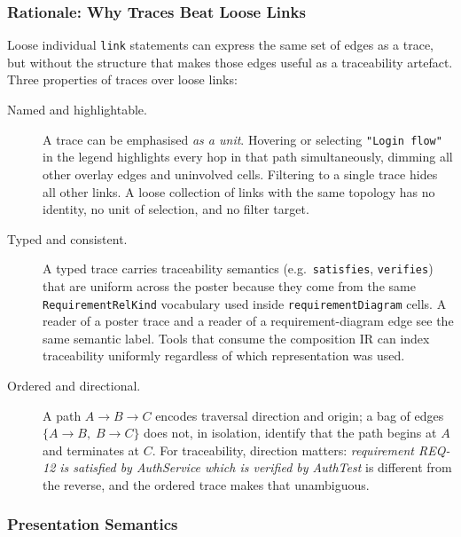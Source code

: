 \subsubsection{Rationale: Why Traces Beat Loose Links}
\label{sec:cdl-trace-rationale}

Loose individual \texttt{link} statements can express the same set of edges as
a trace, but without the structure that makes those edges useful as a
traceability artefact.  Three properties of traces over loose links:

\begin{description}
  \item[Named and highlightable.]
    A trace can be emphasised \emph{as a unit}.  Hovering or selecting
    \texttt{"Login flow"} in the legend highlights every hop in that path
    simultaneously, dimming all other overlay edges and uninvolved cells.
    Filtering to a single trace hides all other links.  A loose collection of
    links with the same topology has no identity, no unit of selection, and no
    filter target.

  \item[Typed and consistent.]
    A typed trace carries traceability semantics (e.g.\ \texttt{satisfies},
    \texttt{verifies}) that are uniform across the poster because they come
    from the same \texttt{RequirementRelKind} vocabulary used inside
    \texttt{requirementDiagram} cells.  A reader of a poster trace and a
    reader of a requirement-diagram edge see the same semantic label.  Tools
    that consume the composition IR can index traceability uniformly regardless
    of which representation was used.

  \item[Ordered and directional.]
    A path $A \to B \to C$ encodes traversal direction and origin; a bag of
    edges $\{A \to B,\; B \to C\}$ does not, in isolation, identify that the
    path begins at $A$ and terminates at $C$.  For traceability, direction
    matters: \emph{requirement REQ-12 is satisfied by AuthService which is
    verified by AuthTest} is different from the reverse, and the ordered trace
    makes that unambiguous.
\end{description}

\subsubsection{Presentation Semantics}
\label{sec:cdl-trace-presentation}

